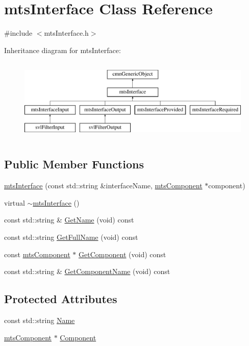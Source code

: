 \hypertarget{classmts_interface}{}\section{mts\+Interface Class Reference}
\label{classmts_interface}


{\ttfamily \#include $<$mts\+Interface.\+h$>$}

Inheritance diagram for mts\+Interface\+:\begin{figure}[H]
\begin{center}
\leavevmode
\includegraphics[height=4.000000cm]{d2/d17/classmts_interface}
\end{center}
\end{figure}
\subsection*{Public Member Functions}
\begin{DoxyCompactItemize}
\item 
\hyperlink{classmts_interface_a81550185a767638618b32090dcd44878}{mts\+Interface} (const std\+::string \&interface\+Name, \hyperlink{classmts_component}{mts\+Component} $\ast$component)
\item 
virtual \hyperlink{classmts_interface_a6a1752d31236ceb008ca40f4ee82c773}{$\sim$mts\+Interface} ()
\item 
const std\+::string \& \hyperlink{classmts_interface_ac56c1713f186cdd01f78e6cd62c678ff}{Get\+Name} (void) const 
\item 
const std\+::string \hyperlink{classmts_interface_a4bd6689c8baacc8dc5e635ac09afca31}{Get\+Full\+Name} (void) const 
\item 
const \hyperlink{classmts_component}{mts\+Component} $\ast$ \hyperlink{classmts_interface_a08628db382b7d92145c55d6f0397b4c8}{Get\+Component} (void) const 
\item 
const std\+::string \& \hyperlink{classmts_interface_a927f3c64a832e9fb05956b27863f2531}{Get\+Component\+Name} (void) const 
\end{DoxyCompactItemize}
\subsection*{Protected Attributes}
\begin{DoxyCompactItemize}
\item 
const std\+::string \hyperlink{classmts_interface_a2c42a04708dfe68848d34bff4a5ee80b}{Name}
\item 
\hyperlink{classmts_component}{mts\+Component} $\ast$ \hyperlink{classmts_interface_a7529d1beb91c4e4786d4c7e377bb91ae}{Component}
\end{DoxyCompactItemize}


